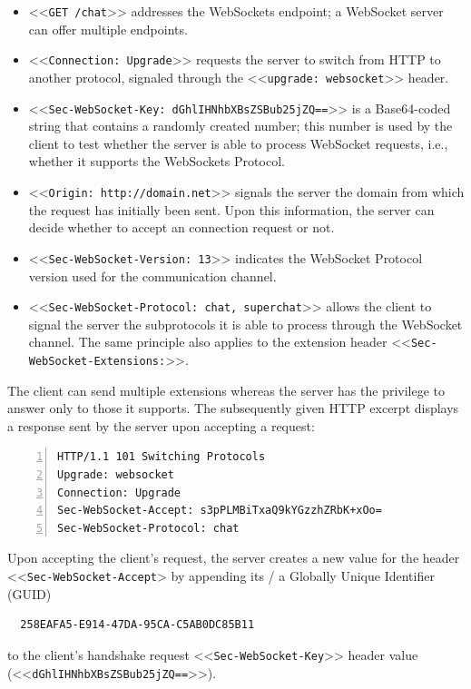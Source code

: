 \documentclass[a4paper, justified, notoc]{tufte-handout} %
\begin{document}
\begin{itemize}
	\item <<\texttt{GET /chat}>> addresses the WebSockets endpoint; a WebSocket server can offer multiple endpoints. 
	\item <<\texttt{Connection: Upgrade}>> requests the server to switch from HTTP to another protocol, signaled through the <<\texttt{upgrade: websocket}>> header. 
	\item <<\texttt{Sec-WebSocket-Key: dGhlIHNhbXBsZSBub25jZQ==}>> is a Base64-coded string that contains a randomly created number; this number is used by the client to test whether the server is able to process WebSocket requests, i.e., whether it supports the WebSockets Protocol. 
	\item <<\texttt{Origin: http://domain.net}>> signals the server the domain from which the request has initially been sent. Upon this information, the server can decide whether to accept an connection request or not.
	\item  <<\texttt{Sec-WebSocket-Version: 13}>> indicates the WebSocket Protocol version used for the communication channel. 
	\item  <<\texttt{Sec-WebSocket-Protocol: chat, superchat}>> allows the client to signal the server the subprotocols it is able to process through the WebSocket channel. The same principle also applies to the extension header <<\texttt{Sec-WebSocket-Extensions:}>>. 
\end{itemize} 

The client can send multiple extensions whereas the server has the privilege to answer only to those it supports. The subsequently given HTTP excerpt displays a response sent by the server upon accepting a request: %

\begin{Verbatim}[gobble=0,frame=lines,numbers=left]
HTTP/1.1 101 Switching Protocols
Upgrade: websocket
Connection: Upgrade
Sec-WebSocket-Accept: s3pPLMBiTxaQ9kYGzzhZRbK+xOo= 
Sec-WebSocket-Protocol: chat
\end{Verbatim}

Upon accepting the client's request, the server creates a new value for the header <<\texttt{Sec-WebSocket-Accept}> by appending its / a Globally Unique Identifier (GUID)
\begin{Verbatim}
  258EAFA5-E914-47DA-95CA-C5AB0DC85B11
\end{Verbatim}
to the client's handshake request <<\texttt{Sec-WebSocket-Key}>> header value (<<\texttt{dGhlIHNhbXBsZSBub25jZQ==}>>).
\end{document}
